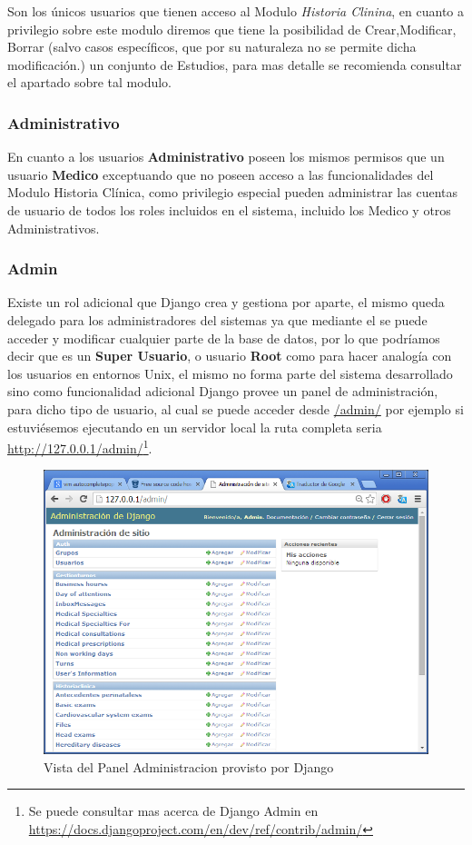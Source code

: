 Son los únicos usuarios que tienen acceso al Modulo \textit{Historia Clinina}, en cuanto
a privilegio sobre este modulo diremos que tiene la posibilidad de Crear,Modificar,
Borrar (salvo casos específicos, que por su naturaleza no se permite dicha 
modificación.) un conjunto de Estudios, para mas detalle se recomienda consultar
el apartado sobre tal modulo.

\subsubsection{Administrativo}

En cuanto a los usuarios \textbf{Administrativo} poseen los mismos permisos que 
un usuario \textbf{Medico} exceptuando que no poseen acceso a las funcionalidades 
del Modulo Historia Clínica, como privilegio especial pueden administrar las 
cuentas de usuario de todos los roles incluidos en el sistema, incluido los 
Medico y otros Administrativos.

\subsubsection{Admin}

Existe un rol adicional que Django crea y gestiona por aparte, el mismo queda 
delegado para los administradores del sistemas ya que mediante el se puede acceder
y modificar cualquier parte de la base de datos, por lo que podríamos decir que 
es un \textbf{Super Usuario}, o usuario \textbf{Root} como para hacer analogía
con los usuarios en entornos Unix, el mismo no forma parte del sistema desarrollado
sino como funcionalidad adicional Django provee un panel de administración, 
para dicho tipo de usuario, al cual se puede acceder desde \url{/admin/} por ejemplo
si estuviésemos ejecutando en un servidor local la ruta completa seria 
\url{http://127.0.0.1/admin/}\footnote{Se puede consultar mas acerca de Django
Admin en \url{https://docs.djangoproject.com/en/dev/ref/contrib/admin/}}.\\[0.1cm]


\begin{figure}[h]
    \centering
    \includegraphics[scale=0.5]{resourse/django-admin.png}
    \caption{Vista del Panel Administracion provisto por Django}
    \label{fig:123}
\end{figure}  


